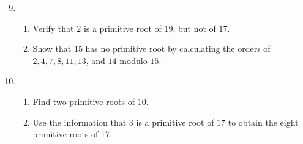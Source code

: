 \documentclass[12pt]{exam}
\theoremstyle{definition}
\begin{document}
\begin{enumerate}
      \setcounter{enumi}{8}
      \item \begin{enumerate}
            \item Verify that $2$ is a primitive root of $19$, but not of $17$.
            \begin{answer}
            \end{answer}

            \item Show that $15$ has no primitive root by calculating the orders of 
            $2, 4, 7, 8, 11, 13$, and $14$ modulo $15$.
            \begin{answer}
            \end{answer}
      \end{enumerate}

      \setcounter{enumi}{10}
      \item \begin{enumerate}
            \item Find two primitive roots of $10$.
            \begin{answer}
            \end{answer}
            
            \item Use the information that $3$ is a primitive root of $17$ 
            to obtain the eight primitive roots of $17$.
            \begin{answer}
            \end{answer}

      \end{enumerate}
\end{enumerate}
\end{document}
